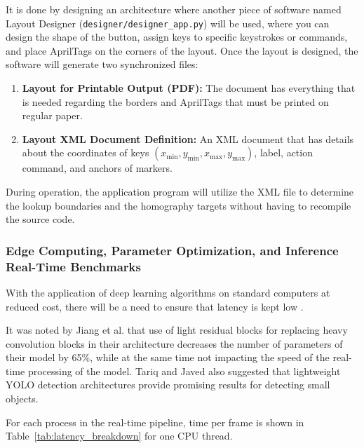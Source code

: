 It is done by designing an architecture where another piece of software named Layout Designer (\texttt{designer/designer\_app.py}) will be used, where you can design the shape of the button, assign keys to specific keystrokes or commands, and place AprilTags on the corners of the layout. Once the layout is designed, the software will generate two synchronized files:
\begin{enumerate}
    \item \textbf{Layout for Printable Output (PDF):} The document has everything that is needed regarding the borders and AprilTags that must be printed on regular paper.
    \item \textbf{Layout XML Document Definition:} An XML document that has details about the coordinates of keys $(x_{\min}, y_{\min}, x_{\max}, y_{\max})$, label, action command, and anchors of markers.
\end{enumerate}

During operation, the application program will utilize the XML file to determine the lookup boundaries and the homography targets without having to recompile the source code.

\subsubsection{Edge Computing, Parameter Optimization, and Inference Real-Time Benchmarks}
With the application of deep learning algorithms on standard computers at reduced cost, there will be a need to ensure that latency is kept low \cite{Jiang2021RealTime, Tariq2025Small, Ivacko2024Edge}.

It was noted by Jiang et al. \cite{Jiang2021RealTime} that use of light residual blocks for replacing heavy convolution blocks in their architecture decreases the number of parameters of their model by 65\%, while at the same time not impacting the speed of the real-time processing of the model. Tariq and Javed \cite{Tariq2025Small} also suggested that lightweight YOLO detection architectures provide promising results for detecting small objects.

For each process in the real-time pipeline, time per frame is shown in Table~\ref{tab:latency_breakdown} for one CPU thread.

